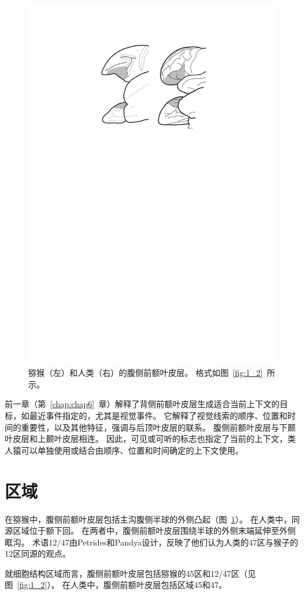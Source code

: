 \begin{figure} 
	\centering
	\includegraphics[width=0.7\linewidth]{chap7/7_1}
	\caption{猕猴（左）和人类（右）的腹侧前额叶皮层。
		格式如图~\ref{fig:1_2}~所示。\label{fig:7_1}}
\end{figure}
\par

前一章（第~\ref{chap:chap6}~章）解释了背侧前额叶皮层生成适合当前上下文的目标，如最近事件指定的，尤其是视觉事件。
它解释了视觉线索的顺序、位置和时间的重要性，以及其他特征，强调与后顶叶皮层的联系。
腹侧前额叶皮层与下颞叶皮层和上颞叶皮层相连。
因此，可见或可听的标志也指定了当前的上下文，类人猿可以单独使用或结合由顺序、位置和时间确定的上下文使用。



\section{区域}
\par
在猕猴中，腹侧前额叶皮层包括主沟腹侧半球的外侧凸起（图~\ref{fig:7_1}）。
在人类中，同源区域位于额下回。
在两者中，腹侧前额叶皮层围绕半球的外侧末端延伸至外侧眶沟。
术语12/47由Petrides和Pandya设计，反映了他们认为人类的47区与猴子的12区同源的观点\cite{petrides2002comparative}。
\par
就细胞结构区域而言，腹侧前额叶皮层包括猕猴的45区和12/47区（见图~\ref{fig:1_2}）。
在人类中，腹侧前额叶皮层包括区域45和47。


